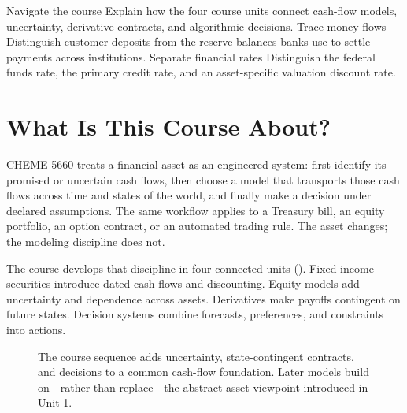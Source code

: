 \documentclass[11pt]{article}
\begin{document}

\learningobjectives
  {Navigate the course}
  {Explain how the four course units connect cash-flow models, uncertainty, derivative contracts, and algorithmic decisions.}
  {Trace money flows}
  {Distinguish customer deposits from the reserve balances banks use to settle payments across institutions.}
  {Separate financial rates}
  {Distinguish the federal funds rate, the primary credit rate, and an asset-specific valuation discount rate.}

\section{What Is This Course About?}

CHEME 5660 treats a financial asset as an engineered system: first identify its promised or uncertain cash flows, then choose a model that transports those cash flows across time and states of the world, and finally make a decision under declared assumptions. The same workflow applies to a Treasury bill, an equity portfolio, an option contract, or an automated trading rule. The asset changes; the modeling discipline does not.

The course develops that discipline in four connected units (). Fixed-income securities introduce dated cash flows and discounting. Equity models add uncertainty and dependence across assets. Derivatives make payoffs contingent on future states. Decision systems combine forecasts, preferences, and constraints into actions.

\begin{figure}[ht]
  \centering
  \caption{The course sequence adds uncertainty, state-contingent contracts, and decisions to a common cash-flow foundation. Later models build on---rather than replace---the abstract-asset viewpoint introduced in Unit 1.}
  \label{fig:course-map}
\end{figure}
\end{document}
